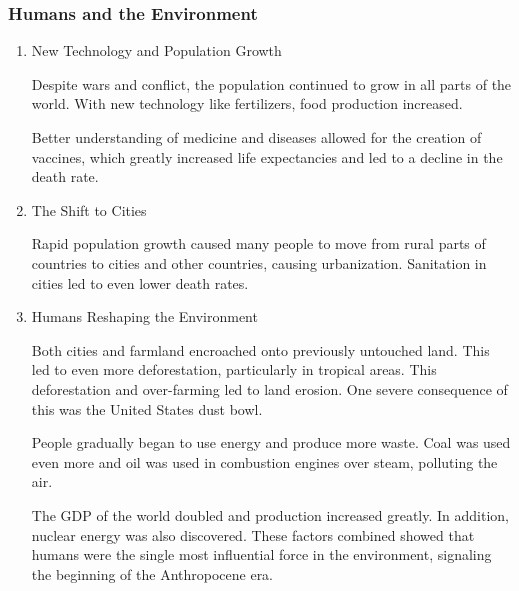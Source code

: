 \documentclass[11pt]{article}
\begin{document}
\subsubsection{Humans and the Environment}
\label{sec:org186de77}
\begin{enumerate}
\item New Technology and Population Growth
\label{sec:orgbbd0f80}

Despite wars and conflict, the population continued to grow in all parts of the world. With new technology like fertilizers, food production increased.

Better understanding of medicine and diseases allowed for the creation of vaccines, which greatly increased life expectancies and led to a decline in the death rate.

\item The Shift to Cities
\label{sec:orgd0b4a1d}

Rapid population growth caused many people to move from rural parts of countries to cities and other countries, causing urbanization. Sanitation in cities led to even lower death rates.

\item Humans Reshaping the Environment
\label{sec:org91e1b7e}

Both cities and farmland encroached onto previously untouched land. This led to even more deforestation, particularly in tropical areas. This deforestation and over-farming led to land erosion. One severe consequence of this was the United States dust bowl.

People gradually began to use energy and produce more waste. Coal was used even more and oil was used in combustion engines over steam, polluting the air.

The GDP of the world doubled and production increased greatly. In addition, nuclear energy was also discovered. These factors combined showed that humans were the single most influential force in the environment, signaling the beginning of the Anthropocene era.
\end{enumerate}
\end{document}
